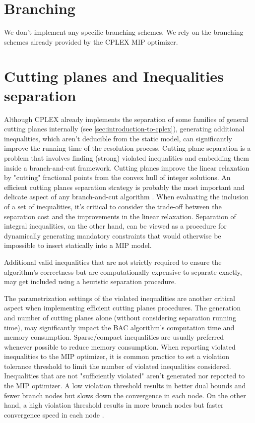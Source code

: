 \section{Branching}
\label{sec:impl-branching}

We don't implement any specific branching schemes.
We rely on the branching schemes already provided by the CPLEX MIP optimizer.

\section{Cutting planes and Inequalities separation}
\label{sec:impl-separation-techniques}

Although CPLEX already implements
the separation of some families of general cutting planes internally
(see \cref{sec:introduction-to-cplex}),
generating additional inequalities,
which aren't deducible from the static model,
can significantly improve the running time of the resolution process.
Cutting plane separation is a problem that involves finding (strong) violated inequalities
and embedding them inside a branch-and-cut framework.
Cutting planes improve the linear relaxation
by "cutting" fractional points from the convex hull of integer solutions.
An efficient cutting planes separation strategy
is probably the most important and delicate aspect of any branch-and-cut algorithm \parencite{ralphs2003}.
When evaluating the inclusion of a set of inequalities, it's critical to consider
the trade-off between the separation cost and the improvements in the linear relaxation.
Separation of integral inequalities, on the other hand,
can be viewed as a procedure for dynamically generating mandatory constraints
that would otherwise be impossible to insert statically into a MIP model.

Additional valid inequalities that are not strictly required to ensure the algorithm's correctness
but are computationally expensive to separate exactly,
may get included using a heuristic separation procedure.

The parametrization settings of the violated inequalities are another critical aspect
when implementing efficient cutting planes procedures.
The generation and number of cutting planes alone (without considering separation running time),
may significantly impact the BAC algorithm's computation time and memory consumption.
Sparse/compact inequalities are usually preferred whenever possible to reduce memory consumption.
When reporting violated inequalities to the MIP optimizer,
it is common practice to set a violation tolerance threshold
to limit the number of violated inequalities considered.
Inequalities that are not "sufficiently violated" aren't generated nor reported to the MIP optimizer.
A low violation threshold results in better dual bounds
and fewer branch nodes but slows down the convergence in each node.
On the other hand, a high violation threshold results in more branch nodes
but faster convergence speed in each node \parencite{jepsen2008branchandcut}.

